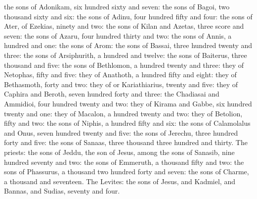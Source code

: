 {the sons of Adonikam, six hundred sixty and seven: the sons of
 Bagoi, two thousand sixty and six: the sons of
 Adinu, four hundred fifty and four:
the sons of
 Ater, of Ezekias, ninety and two: the sons of Kilan and Azetas, three score and seven: the sons of
 Azaru, four hundred thirty and two:
the sons of
 Annis, a hundred and one: the sons of Arom: the sons of
 Bassai, three hundred twenty and three: the sons of Arsiphurith, a hundred and twelve:
the sons of Baiterus, three thousand and five: the sons of
 Bethlomon, a hundred twenty and three:
they of Netophas, fifty and five: they of Anathoth, a hundred fifty and eight: they of
 Bethasmoth, forty and two:
they of
 or
 Kariathiarius, twenty and five: they of Caphira and Beroth, seven hundred forty and three:
the Chadiasai and Ammidioi, four hundred twenty and two: they of
 Kirama and
 Gabbe, six hundred twenty and one:
they of
 Macalon, a hundred twenty and two: they of
 Betolion, fifty and two: the sons of
 Niphis, a hundred fifty and six:
the sons of
 Calamolalus and
 Onus, seven hundred twenty and five: the sons of
 Jerechu,
 three hundred forty and five:
the sons of
 Sanaas, three thousand three hundred and
 thirty.
The priests: the sons of
 Jeddu, the son of Jesus, among the sons of Sanasib,
 nine hundred seventy and two: the sons of
 Emmeruth,
 a thousand fifty and two:
the sons of
 Phassurus, a thousand two hundred forty and seven: the sons of
 Charme,
 a thousand and seventeen.
The Levites: the sons of Jesus, and Kadmiel, and Bannas, and Sudias, seventy and four.
}
